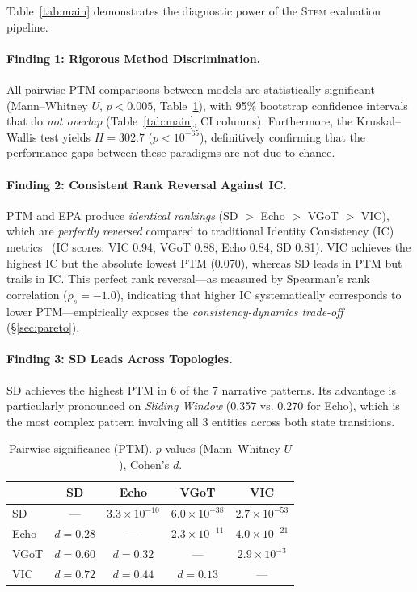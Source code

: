 \documentclass[sigconf,review,anonymous]{acmart}
\theoremstyle{definition}
\newcommand{\stem}{\textsc{Stem}}
\begin{document}
Table~\ref{tab:main} demonstrates the diagnostic power of the \stem{} evaluation pipeline.

\paragraph{Finding 1: Rigorous Method Discrimination.}
All pairwise PTM comparisons between models are statistically significant (Mann--Whitney $U$, $p < 0.005$, Table~\ref{tab:significance}), with 95\% bootstrap confidence intervals that do \emph{not overlap} (Table~\ref{tab:main}, CI columns). Furthermore, the Kruskal--Wallis test yields $H = 302.7$ ($p < 10^{-65}$), definitively confirming that the performance gaps between these paradigms are not due to chance.

\paragraph{Finding 2: Consistent Rank Reversal Against IC.}
PTM and EPA produce \emph{identical rankings} (SD $>$ Echo $>$ VGoT $>$ VIC), which are \emph{perfectly reversed} compared to traditional Identity Consistency (IC) metrics~\cite{shotadapter} (IC scores: VIC 0.94, VGoT 0.88, Echo 0.84, SD 0.81). VIC achieves the highest IC but the absolute lowest PTM (0.070), whereas SD leads in PTM but trails in IC. This perfect rank reversal---as measured by Spearman's rank correlation ($\rho_s = -1.0$), indicating that higher IC systematically corresponds to lower PTM---empirically exposes the \emph{consistency-dynamics trade-off} (\S\ref{sec:pareto}).

\paragraph{Finding 3: SD Leads Across Topologies.}
SD achieves the highest PTM in 6 of the 7 narrative patterns. Its advantage is particularly pronounced on \emph{Sliding Window} (0.357 vs. 0.270 for Echo), which is the most complex pattern involving all 3 entities across both state transitions.

\begin{table}[t]
\caption{Pairwise significance (PTM). $p$-values (Mann--Whitney $U$), Cohen's $d$.}
\label{tab:significance}
\centering
\small
\setlength{\tabcolsep}{3pt}
\begin{tabular}{@{}lcccc@{}}
\toprule
& SD & Echo & VGoT & VIC \\
\midrule
SD & --- & $3.3\!\times\!10^{-10}$ & $6.0\!\times\!10^{-38}$ & $2.7\!\times\!10^{-53}$ \\
Echo & $d{=}0.28$ & --- & $2.3\!\times\!10^{-11}$ & $4.0\!\times\!10^{-21}$ \\
VGoT & $d{=}0.60$ & $d{=}0.32$ & --- & $2.9\!\times\!10^{-3}$ \\
VIC & $d{=}0.72$ & $d{=}0.44$ & $d{=}0.13$ & --- \\
\bottomrule
\end{tabular}
\end{table}
\end{document}
